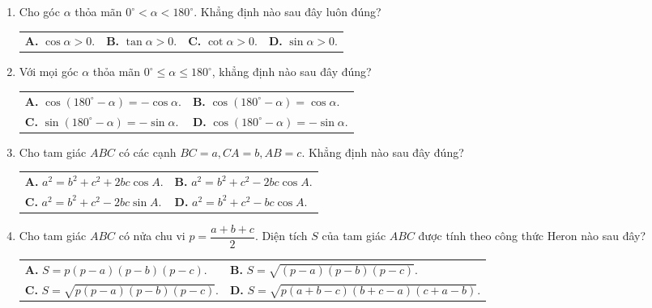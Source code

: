 \documentclass[12pt,a4paper]{article}
\makeatletter
\newcommand{\four}[4]{\par\noindent\begin{tabularx}{\linewidth}{@{}*{4}{>{\raggedright\arraybackslash}X}@{}}\textbf{A.} #1&\textbf{B.} #2&\textbf{C.} #3&\textbf{D.} #4\end{tabularx}}
\newcommand{\two}[4]{\par\noindent\begin{tabularx}{\linewidth}{@{}*{2}{>{\raggedright\arraybackslash}X}@{}}\textbf{A.} #1&\textbf{B.} #2\\[3pt]\textbf{C.} #3&\textbf{D.} #4\end{tabularx}}
\makeatother
\begin{document}
\begin{enumerate}
\four{$(3; 2)$.}{$(-1; 2)$.}{$(1; 1)$.}{$(2; 3)$.}
\item Cho góc $\alpha$ thỏa mãn $0^\circ < \alpha < 180^\circ$. Khẳng định nào sau đây luôn đúng?
\four{$\cos\alpha > 0$.}{$\tan\alpha > 0$.}{$\cot\alpha > 0$.}{$\sin\alpha > 0$.}
\item Với mọi góc $\alpha$ thỏa mãn $0^\circ \leq \alpha \leq 180^\circ$, khẳng định nào sau đây đúng?
\two{$\cos(180^\circ - \alpha) = -\cos\alpha$.}{$\cos(180^\circ - \alpha) = \cos\alpha$.}{$\sin(180^\circ - \alpha) = -\sin\alpha$.}{$\cos(180^\circ - \alpha) = -\sin\alpha$.}
\item Cho tam giác $ABC$ có các cạnh $BC = a, CA = b, AB = c$. Khẳng định nào sau đây đúng?
\two{$a^2 = b^2 + c^2 + 2bc\cos A$.}{$a^2 = b^2 + c^2 - 2bc\cos A$.}{$a^2 = b^2 + c^2 - 2bc\sin A$.}{$a^2 = b^2 + c^2 - bc\cos A$.}
\item Cho tam giác $ABC$ có nửa chu vi $p = \dfrac{a + b + c}{2}$. Diện tích $S$ của tam giác $ABC$ được tính theo công thức Heron nào sau đây?
\two{$S = p(p - a)(p - b)(p - c)$.}{$S = \sqrt{(p - a)(p - b)(p - c)}$.}{$S = \sqrt{p(p - a)(p - b)(p - c)}$.}{$S = \sqrt{p(a + b - c)(b + c - a)(c + a - b)}$.}
\end{enumerate}
\end{document}
